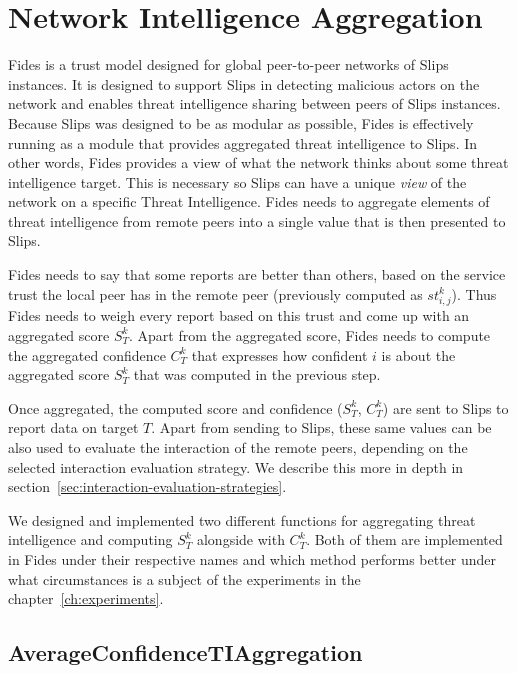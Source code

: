\section{Network Intelligence Aggregation}
\label{sec:network-intelligence-aggregation}
Fides is a trust model designed for global peer-to-peer networks of Slips instances.
It is designed to support Slips in detecting malicious actors on the network and enables threat intelligence sharing between peers of Slips instances.
Because Slips was designed to be as modular as possible, Fides is effectively running as a module that provides aggregated threat intelligence to Slips. 
In other words, Fides provides a view of what the network thinks about some threat intelligence target. This is necessary so Slips can have a unique \textit{view} of the network on a specific Threat Intelligence.
Fides needs to aggregate elements of threat intelligence from remote peers into a single value that is then presented to Slips.

Fides needs to say that some reports are better than others, based on the service trust the local peer has in the remote peer (previously computed as $st^{k}_{i, j}$).
Thus Fides needs to weigh every report based on this trust and come up with an aggregated score $S^{k}_{T}$.
Apart from the aggregated score, Fides needs to compute the aggregated confidence $C^{k}_{T}$ that expresses how confident $i$ is about the aggregated score $S^{k}_{T}$ that was computed in the previous step.

Once aggregated, the computed score and confidence ($S^{k}_{T}$, $C^{k}_{T}$) are sent to Slips to report data on target $T$.
Apart from sending to Slips, these same values can be also used to evaluate the interaction of the remote peers, depending on the selected interaction evaluation strategy. We describe this more in depth in section~\ref{sec:interaction-evaluation-strategies}.

We designed and implemented two different functions for aggregating threat intelligence and computing $S^{k}_{T}$ alongside with $C^{k}_{T}$.
Both of them are implemented in Fides under their respective names and which method performs better under what circumstances is a subject of the experiments in the chapter~\ref{ch:experiments}.

\subsection{AverageConfidenceTIAggregation}
\label{subsec:AverageConfidenceTIAggregation}

